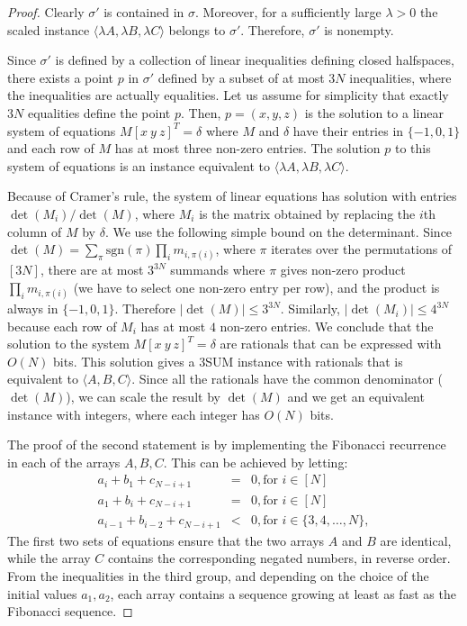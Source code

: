\begin{proof}
Clearly $\sigma'$ is contained in $\sigma$. Moreover, for a sufficiently large $\lambda>0$
the scaled instance $\langle \lambda A,\lambda B,\lambda C \rangle$ belongs to $\sigma'$.
Therefore, $\sigma'$ is nonempty.

Since $\sigma'$ is defined by a collection of linear inequalities defining closed halfspaces,
there exists a point $p$ in $\sigma'$ defined by a subset of at most $3N$ inequalities, 
where the inequalities are actually equalities. Let us assume for simplicity that
exactly $3N$ equalities define the point $p$. Then, $p=(x,y,z)$ is the solution
to a linear system of equations $M [x~ y ~z]^T=\delta$ 
where $M$ and $\delta$ have their entries in $\{ -1,0,1 \}$
and each row of $M$ has at most three non-zero entries. The solution $p$ to this
system of equations is an instance equivalent to $\langle \lambda A,\lambda B,\lambda C \rangle$.

Because of Cramer's rule, the system of linear equations has solution with entries
$\det(M_i)/\det(M)$,
where $M_i$ is the matrix obtained by replacing the $i$th column of $M$ by $\delta$.
We use the following simple bound on the determinant.
Since $\det(M)=\sum_{\pi}\mathrm{sgn}(\pi) \prod_i m_{i,\pi(i)}$, where
$\pi$ iterates over the permutations of $[3N]$, there are 
at most $3^{3N}$ summands where $\pi$ gives non-zero product $\prod_i m_{i,\pi(i)}$ (we have
to select one non-zero entry per row), and the product is always in $\{ -1,0,1\}$.
Therefore $|\det(M)|\leq 3^{3N}$. Similarly, $|\det(M_i)|\leq 4^{3N}$ because
each row of $M_i$ has at most $4$ non-zero entries.
We conclude that the solution to the system $M [x~ y ~z]^T=\delta$ 
are rationals that can be expressed with $O(N)$ bits. This solution gives
a 3SUM instance with rationals that is equivalent to $\langle A, B, C \rangle$. 
Since all the rationals have the common denominator ($\det(M)$), we can scale the result
by $\det(M)$ and we get an equivalent instance with integers, where 
each integer has $O(N)$ bits.

The proof of the second statement is by implementing the Fibonacci recurrence in each of the
arrays $A,B,C$. This can be achieved by letting:
\begin{eqnarray*}
  a_i + b_1 + c_{N-i+1} & = & 0, \text{for }i\in [N] \\
  a_1 + b_i + c_{N-i+1} & = & 0, \text{for }i\in [N] \\
  a_{i-1} + b_{i-2} + c_{N-i+1} & < & 0, \text{for }i\in \{3,4,\ldots ,N\},
\end{eqnarray*}
The first two sets of equations ensure that the two arrays $A$ and $B$ are identical, while
the array $C$ contains the corresponding negated numbers, in reverse order.
From the inequalities in the third group, and depending on the choice of the initial values $a_1, a_2$,
each array contains a sequence growing at least as fast as the Fibonacci sequence.
\end{proof}

